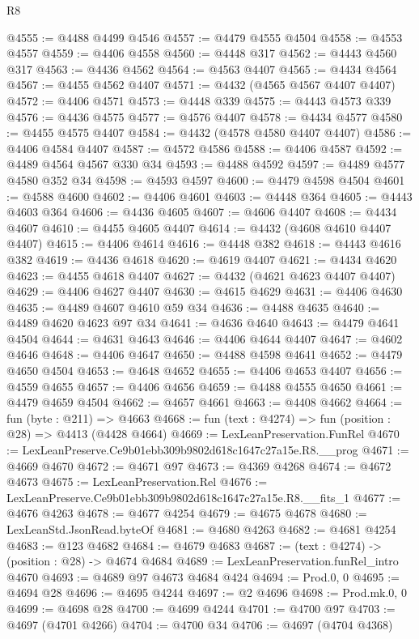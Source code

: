 \begin{lexlean}{R8}
\begin{coremodule}
@4555 := @4488 @4499 @4546
@4557 := @4479 @4555 @4504
@4558 := @4553 @4557
@4559 := @4406 @4558
@4560 := @4448 @317
@4562 := @4443 @4560 @317
@4563 := @4436 @4562
@4564 := @4563 @4407
@4565 := @4434 @4564
@4567 := @4455 @4562 @4407
@4571 := @4432 (@4565 @4567 @4407 @4407)
@4572 := @4406 @4571
@4573 := @4448 @339
@4575 := @4443 @4573 @339
@4576 := @4436 @4575
@4577 := @4576 @4407
@4578 := @4434 @4577
@4580 := @4455 @4575 @4407
@4584 := @4432 (@4578 @4580 @4407 @4407)
@4586 := @4406 @4584 @4407
@4587 := @4572 @4586
@4588 := @4406 @4587
@4592 := @4489 @4564 @4567 @330 @34
@4593 := @4488 @4592
@4597 := @4489 @4577 @4580 @352 @34
@4598 := @4593 @4597
@4600 := @4479 @4598 @4504
@4601 := @4588 @4600
@4602 := @4406 @4601
@4603 := @4448 @364
@4605 := @4443 @4603 @364
@4606 := @4436 @4605
@4607 := @4606 @4407
@4608 := @4434 @4607
@4610 := @4455 @4605 @4407
@4614 := @4432 (@4608 @4610 @4407 @4407)
@4615 := @4406 @4614
@4616 := @4448 @382
@4618 := @4443 @4616 @382
@4619 := @4436 @4618
@4620 := @4619 @4407
@4621 := @4434 @4620
@4623 := @4455 @4618 @4407
@4627 := @4432 (@4621 @4623 @4407 @4407)
@4629 := @4406 @4627 @4407
@4630 := @4615 @4629
@4631 := @4406 @4630
@4635 := @4489 @4607 @4610 @59 @34
@4636 := @4488 @4635
@4640 := @4489 @4620 @4623 @97 @34
@4641 := @4636 @4640
@4643 := @4479 @4641 @4504
@4644 := @4631 @4643
@4646 := @4406 @4644 @4407
@4647 := @4602 @4646
@4648 := @4406 @4647
@4650 := @4488 @4598 @4641
@4652 := @4479 @4650 @4504
@4653 := @4648 @4652
@4655 := @4406 @4653 @4407
@4656 := @4559 @4655
@4657 := @4406 @4656
@4659 := @4488 @4555 @4650
@4661 := @4479 @4659 @4504
@4662 := @4657 @4661
@4663 := @4408 @4662
@4664 := fun (byte : @211) => @4663
@4668 := fun (text : @4274) => fun (position : @28) => @4413 (@4428 @4664)
@4669 := LexLeanPreservation.FunRel
@4670 := LexLeanPreserve.Ce9b01ebb309b9802d618c1647c27a15e.R8.__prog
@4671 := @4669 @4670
@4672 := @4671 @97
@4673 := @4369 @4268
@4674 := @4672 @4673
@4675 := LexLeanPreservation.Rel
@4676 := LexLeanPreserve.Ce9b01ebb309b9802d618c1647c27a15e.R8.__fits_1
@4677 := @4676 @4263
@4678 := @4677 @4254
@4679 := @4675 @4678
@4680 := LexLeanStd.JsonRead.byteOf
@4681 := @4680 @4263
@4682 := @4681 @4254
@4683 := @123 @4682
@4684 := @4679 @4683
@4687 := (text : @4274) -> (position : @28) -> @4674 @4684
@4689 := LexLeanPreservation.funRel_intro @4670
@4693 := @4689 @97 @4673 @4684 @424
@4694 := Prod.{0, 0}
@4695 := @4694 @28
@4696 := @4695 @4244
@4697 := @2 @4696
@4698 := Prod.mk.{0, 0}
@4699 := @4698 @28
@4700 := @4699 @4244
@4701 := @4700 @97
@4703 := @4697 (@4701 @4266)
@4704 := @4700 @34
@4706 := @4697 (@4704 @4368)

\end{coremodule}
\end{lexlean}
